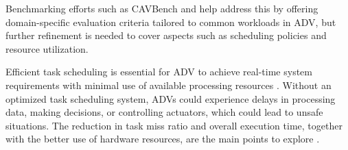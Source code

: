 Benchmarking efforts such as CAVBench \cite{wang2018} and \cite{Jambotkar2021AdaptiveImprovement} help address this by offering domain-specific evaluation criteria tailored to common workloads in ADV, but further refinement is needed to cover aspects such as scheduling policies and resource utilization.

Efficient task scheduling is essential for ADV to achieve real-time system requirements with minimal use of available processing resources \cite{amarnath2021}. Without an optimized task scheduling system, ADVs could experience delays in processing data, making decisions, or controlling actuators, which could lead to unsafe situations\cite{Balasekaran2021}. The reduction in task miss ratio and overall execution time, together with the better use of hardware resources, are the main points to explore \cite{Balasekaran2021}. 
 
 


